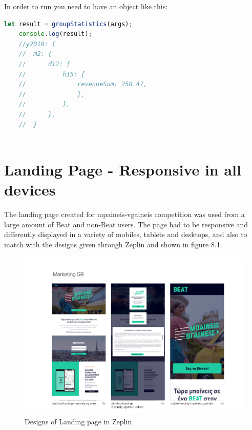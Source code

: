 	\newpage
	In order to run you need to have an object like this:
	
	\begin{lstlisting}[language=JavaScript]
	let result = groupStatistics(args);
	console.log(result);
	//y2018: {
	//	m2: {
	//		d12: {
	//			h15: {
	//				revenueSum: 258.47,
	//				},
	//			},
	//		},
	//	}
	
	\end{lstlisting}
	
	
\section{Landing Page - Responsive in all devices}

The landing page created for mpaineis-vgaineis competition was used from a large amount of Beat and non-Beat users. The page had to be responsive and differently displayed in a variety of mobiles, tablets and desktops, and also to match with the designs given through Zeplin and shown in figure 8.1.

\begin{figure}[H]
	\begin{center}
		\includegraphics[scale=0.4]{images/my_projects/landing_page/zeplin.png}
	\end{center}
	\caption{Designs of Landing page in Zeplin}
\end{figure}

